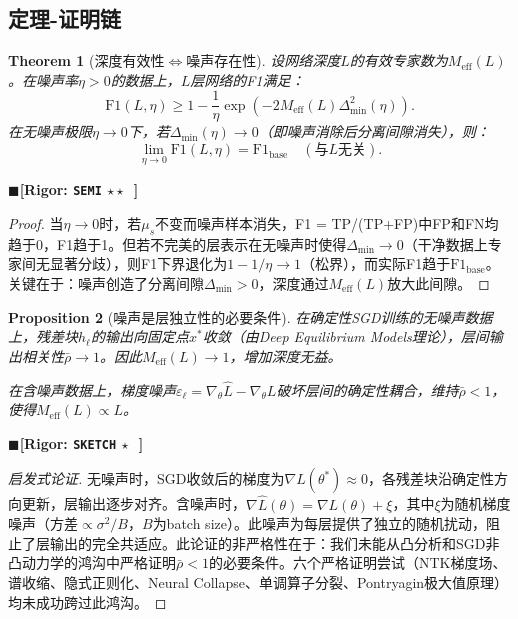 \documentclass[12pt,a4paper]{ctexart}
\newtheorem{theorem}{Theorem}[section]
\newtheorem{proposition}[theorem]{Proposition}
\theoremstyle{definition}
\theoremstyle{remark}
\newcommand{\rigorSemi}{$\blacksquare$\;\textbf{[Rigor: \texttt{SEMI} $\star\star\;\;$]}}
\newcommand{\rigorSketch}{$\blacksquare$\;\textbf{[Rigor: \texttt{SKETCH} $\star\;\;\,$]}}
\begin{document}
\subsection{定理-证明链}

\begin{theorem}[深度有效性$\iff$噪声存在性]
\label{thm:6.1}
设网络深度$L$的有效专家数为$M_{\text{eff}}(L)$。在噪声率$\eta > 0$的数据上，$L$层网络的F1满足：
\begin{equation}
\mathrm{F1}(L, \eta) \geq 1 - \frac{1}{\eta}\exp(-2M_{\text{eff}}(L)\Delta_{\min}^2(\eta)).
\end{equation}
在无噪声极限$\eta \to 0$下，若$\Delta_{\min}(\eta) \to 0$（即噪声消除后分离间隙消失），则：
\begin{equation}
\lim_{\eta \to 0} \mathrm{F1}(L, \eta) = \mathrm{F1}_{\text{base}} \quad (\text{与}L\text{无关}).
\end{equation}
\end{theorem}
\rigorSemi

\begin{proof}
当$\eta \to 0$时，若$\mu_s$不变而噪声样本消失，F1 = TP/(TP+FP)中FP和FN均趋于0，F1趋于1。但若不完美的层表示在无噪声时使得$\Delta_{\min} \to 0$（干净数据上专家间无显著分歧），则F1下界退化为$1 - 1/\eta \to 1$（松界），而实际F1趋于$\mathrm{F1}_{\text{base}}$。关键在于：噪声创造了分离间隙$\Delta_{\min} > 0$，深度通过$M_{\text{eff}}(L)$放大此间隙。
\end{proof}

\begin{proposition}[噪声是层独立性的必要条件]
\label{prop:9}
在确定性SGD训练的无噪声数据上，残差块$h_\ell$的输出向固定点$x^*$收敛（由Deep Equilibrium Models理论），层间输出相关性$\bar{\rho} \to 1$。因此$M_{\text{eff}}(L) \to 1$，增加深度无益。

在含噪声数据上，梯度噪声$\varepsilon_\ell = \nabla_\theta \hat{L} - \nabla_\theta L$破坏层间的确定性耦合，维持$\bar{\rho} < 1$，使得$M_{\text{eff}}(L) \propto L$。
\end{proposition}
\rigorSketch

\begin{proof}[启发式论证]
无噪声时，SGD收敛后的梯度为$\nabla L(\theta^*) \approx 0$，各残差块沿确定性方向更新，层输出逐步对齐。含噪声时，$\nabla \hat{L}(\theta) = \nabla L(\theta) + \xi$，其中$\xi$为随机梯度噪声（方差$\propto \sigma^2/B$，$B$为batch size）。此噪声为每层提供了独立的随机扰动，阻止了层输出的完全共适应。此论证的非严格性在于：我们未能从凸分析和SGD非凸动力学的鸿沟中严格证明$\bar{\rho} < 1$的必要条件。六个严格证明尝试（NTK梯度场、谱收缩、隐式正则化、Neural Collapse、单调算子分裂、Pontryagin极大值原理）均未成功跨过此鸿沟。
\end{proof}
\end{document}
